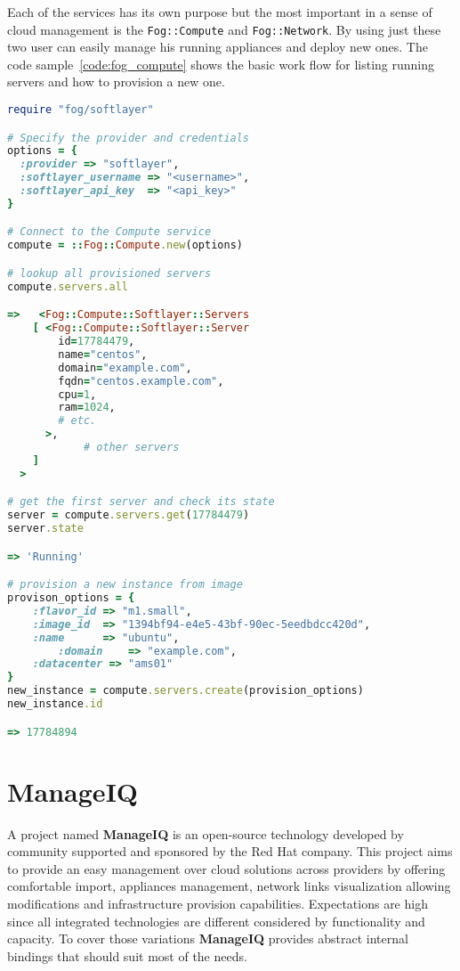 Each of the services has its own purpose but the most important in a sense of cloud management is the \texttt{Fog::Compute} and \texttt{Fog::Network}. By using just these two user can easily manage his running appliances and deploy new ones. The code sample~\ref{code:fog_compute} shows the basic work flow for listing running servers and how to provision a new one.

\begin{lstlisting}[language=Ruby,caption={Example work flow for Fog SoftLayer},label=code:fog_compute,float=htpb]
require "fog/softlayer"

# Specify the provider and credentials
options = {
  :provider => "softlayer",
  :softlayer_username => "<username>",
  :softlayer_api_key  => "<api_key>"
}

# Connect to the Compute service
compute = ::Fog::Compute.new(options)

# lookup all provisioned servers
compute.servers.all

=>   <Fog::Compute::Softlayer::Servers
    [ <Fog::Compute::Softlayer::Server
        id=17784479,
        name="centos",
        domain="example.com",
        fqdn="centos.example.com",
        cpu=1,
        ram=1024,
        # etc.
      >,
			# other servers
    ]
  >

# get the first server and check its state
server = compute.servers.get(17784479)
server.state

=> 'Running'

# provision a new instance from image
provison_options = {
    :flavor_id => "m1.small",
    :image_id  => "1394bf94-e4e5-43bf-90ec-5eedbdcc420d",
    :name      => "ubuntu",
		:domain    => "example.com",
    :datacenter => "ams01"
}
new_instance = compute.servers.create(provision_options)
new_instance.id

=> 17784894
\end{lstlisting}

\chapter{ManageIQ}
\label{chap:ManageIQ}

A project named \textbf{ManageIQ} is an open-source technology developed by community supported and sponsored by the Red Hat company. This project aims to provide an easy management over cloud solutions across providers by offering comfortable import, appliances management, network links visualization allowing modifications and infrastructure provision capabilities. Expectations are high since all integrated technologies are different considered by functionality and capacity. To cover those variations \textbf{ManageIQ} provides abstract internal bindings that should suit most of the needs.

